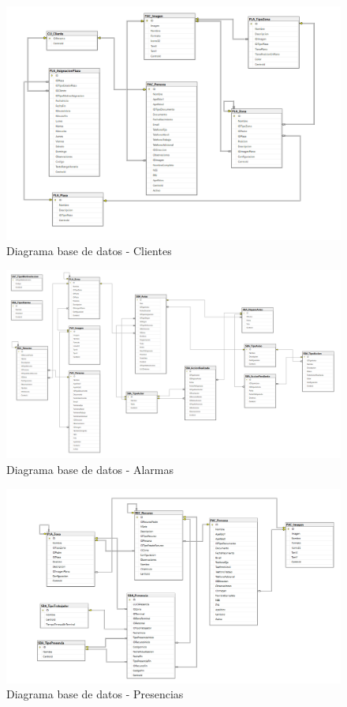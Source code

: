 \begin{figure}[H]
    \centering
    \includegraphics[width=15cm]{Imagenes/Diagrama-BD-Clientes}
    \caption{Diagrama base de datos - Clientes}
    \label{fig:Diagrama-BD-Clientes}
\end{figure}

\begin{figure}[H]
    \centering
    \includegraphics[width=15cm]{Imagenes/Diagrama-BD-Alertas}
    \caption{Diagrama base de datos - Alarmas}
    \label{fig:Diagrama-BD-}
\end{figure}

\begin{figure}[H]
    \centering
    \includegraphics[width=15cm]{Imagenes/Diagrama-BD-Presencias}
    \caption{Diagrama base de datos - Presencias}
    \label{fig:Diagrama-BD-Presencias}
\end{figure}

